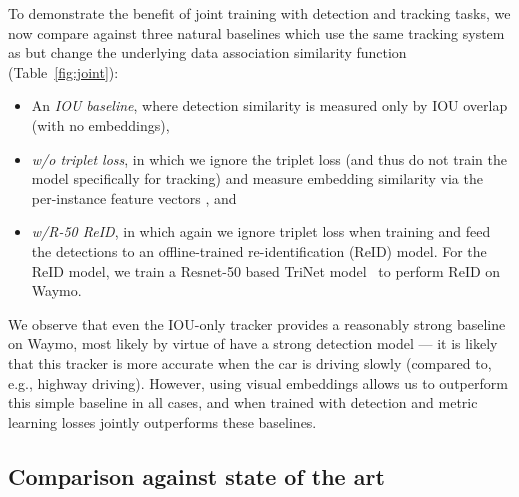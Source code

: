 To demonstrate the benefit of joint training with detection and 
tracking tasks, we now compare \modelname against three natural baselines
which use the same tracking system as \modelname but change the underlying
data association similarity function
(Table~\ref{fig:joint}):
\vspace{-2mm}
\begin{itemize}\denselist
    \item An \emph{IOU baseline}, where  detection similarity
is measured only by IOU overlap  (with no embeddings),
    \item \emph{\modelname w/o triplet loss}, in which we ignore
the triplet loss (and thus do not train the model specifically for tracking) 
and measure
embedding similarity via the per-instance
feature vectors , and
    \item \emph{\modelname w/R-50 ReID}, in which again we ignore
triplet loss when training \modelname and feed the detections
to an offline-trained re-identification (ReID) model. For the ReID model, we train a Resnet-50 based TriNet model~\cite{hermans2017defense} 
to perform ReID on Waymo.
\end{itemize}
We observe that even the IOU-only  tracker provides
a reasonably strong baseline on  Waymo, most likely
by virtue of have a strong detection model --- it is likely
that this tracker is more accurate when the car is driving slowly
(compared to, e.g., highway driving).  However, using visual embeddings allows us to outperform this simple baseline in all cases,
and \modelname when trained with detection and metric learning
losses jointly outperforms these baselines.







      
















\vspace{-2mm}
\subsection{Comparison against state of the art}\label{sec:waymov11}
\vspace{-2mm}








